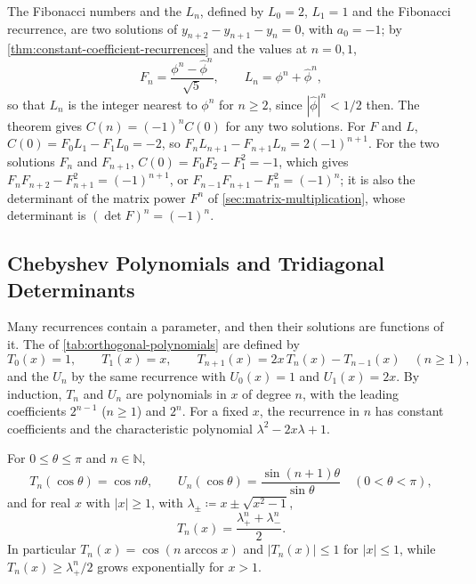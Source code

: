 The Fibonacci numbers and the  $L_n$, defined by $L_0=2$, $L_1=1$ and the Fibonacci recurrence, are two solutions of $y_{n+2}-y_{n+1}-y_n=0$, with $a_0=-1$; by \cref{thm:constant-coefficient-recurrences} and the values at $n=0,1$,
\[
F_n=\frac{\phi^n-\hat\phi^n}{\sqrt5},\qquad L_n=\phi^n+\hat\phi^n ,
\]
so that $L_n$ is the integer nearest to $\phi^n$ for $n\ge2$, since $|\hat\phi|^n<1/2$ then. The theorem gives $C(n)=(-1)^n C(0)$ for any two solutions. For $F$ and $L$, $C(0)=F_0L_1-F_1L_0=-2$, so $F_nL_{n+1}-F_{n+1}L_n=2(-1)^{n+1}$. For the two solutions $F_n$ and $F_{n+1}$, $C(0)=F_0F_2-F_1^2=-1$, which gives  $F_nF_{n+2}-F_{n+1}^2=(-1)^{n+1}$, or $F_{n-1}F_{n+1}-F_n^2=(-1)^n$; it is also the determinant of the matrix power $F^n$ of \cref{sec:matrix-multiplication}, whose determinant is $(\det F)^n=(-1)^n$.

\subsection{Chebyshev Polynomials and Tridiagonal Determinants}

Many recurrences contain a parameter, and then their solutions are functions of it. The  of \cref{tab:orthogonal-polynomials} are defined by
\begin{equation}
T_0(x)=1,\qquad T_1(x)=x,\qquad T_{n+1}(x)=2x\,T_n(x)-T_{n-1}(x)\quad(n\ge1),
\label{eq:chebyshev-recurrence}
\end{equation}
and the  $U_n$ by the same recurrence with $U_0(x)=1$ and $U_1(x)=2x$. By induction, $T_n$ and $U_n$ are polynomials in $x$ of degree $n$, with the leading coefficients $2^{n-1}$ ($n\ge1$) and $2^n$. For a fixed $x$, the recurrence in $n$ has constant coefficients and the characteristic polynomial $\lambda^2-2x\lambda+1$.

\begin{proposition}
\label{prop:chebyshev-closed}
For $0\le\theta\le\pi$ and $n\in\mathbb N$,
\[
T_n(\cos\theta)=\cos n\theta,\qquad U_n(\cos\theta)=\frac{\sin(n+1)\theta}{\sin\theta}\quad(0<\theta<\pi),
\]
and for real $x$ with $|x|\ge1$, with $\lambda_\pm\coloneqq x\pm\sqrt{x^2-1}$,
\[
T_n(x)=\frac{\lambda_+^n+\lambda_-^n}2 .
\]
In particular $T_n(x)=\cos(n\arccos x)$ and $|T_n(x)|\le1$ for $|x|\le1$, while $T_n(x)\ge\lambda_+^n/2$ grows exponentially for $x>1$.
\end{proposition}

